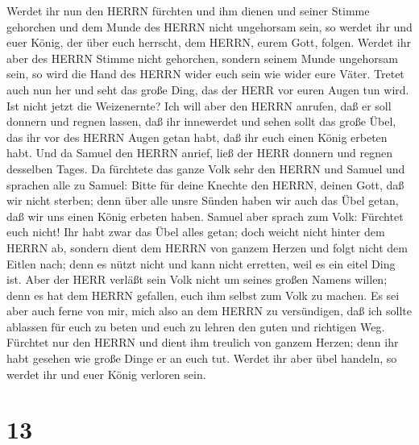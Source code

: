 Werdet ihr nun den HERRN fürchten und ihm dienen und
seiner Stimme gehorchen und dem Munde des HERRN nicht ungehorsam sein,
so werdet ihr und euer König, der über euch herrscht, dem HERRN, eurem
Gott, folgen.  Werdet ihr aber des HERRN Stimme nicht
gehorchen, sondern seinem Munde ungehorsam sein, so wird die Hand des
HERRN wider euch sein wie wider eure Väter.  Tretet auch
nun her und seht das große Ding, das der HERR vor euren Augen tun wird.
 Ist nicht jetzt die Weizenernte? Ich will aber den HERRN
anrufen, daß er soll donnern und regnen lassen, daß ihr innewerdet und
sehen sollt das große Übel, das ihr vor des HERRN Augen getan habt, daß
ihr euch einen König erbeten habt.  Und da Samuel den HERRN
anrief, ließ der HERR donnern und regnen desselben Tages. Da fürchtete
das ganze Volk sehr den HERRN und Samuel  und sprachen alle
zu Samuel: Bitte für deine Knechte den HERRN, deinen Gott, daß wir nicht
sterben; denn über alle unsre Sünden haben wir auch das Übel getan, daß
wir uns einen König erbeten haben.  Samuel aber sprach zum
Volk: Fürchtet euch nicht! Ihr habt zwar das Übel alles getan; doch
weicht nicht hinter dem HERRN ab, sondern dient dem HERRN von ganzem
Herzen  und folgt nicht dem Eitlen nach; denn es nützt
nicht und kann nicht erretten, weil es ein eitel Ding ist. 
Aber der HERR verläßt sein Volk nicht um seines großen Namens willen;
denn es hat dem HERRN gefallen, euch ihm selbst zum Volk zu machen.
 Es sei aber auch ferne von mir, mich also an dem HERRN zu
versündigen, daß ich sollte ablassen für euch zu beten und euch zu
lehren den guten und richtigen Weg.  Fürchtet nur den HERRN
und dient ihm treulich von ganzem Herzen; denn ihr habt gesehen wie
große Dinge er an euch tut.  Werdet ihr aber übel handeln,
so werdet ihr und euer König verloren sein.

\hypertarget{section-12}{%
\section{13}\label{section-12}}

